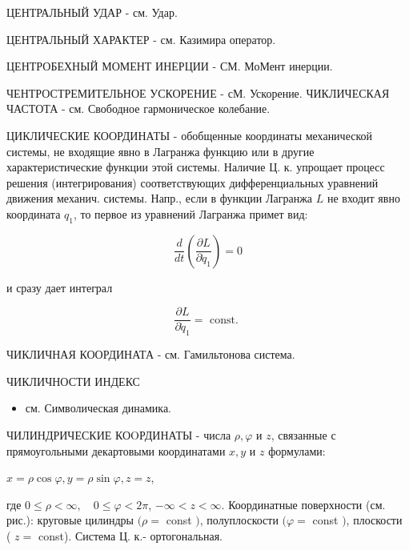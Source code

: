 \documentclass[10pt]{article}
\begin{document}
ЦЕНТРАЛЬНЫЙ УДАР - см. Удар.



ЦЕНТРАЛЬНЫЙ ХАРАКТЕР - см. Казимира оператор.



ЦЕНТРОБЕХНЫЙ МОМЕНТ ИНЕРЦИИ - СМ. МоМент инерции.



ЧЕНТРОСТРЕМИТЕЛЬНОЕ УСКОРЕНИЕ - сМ. Ускорение. ЧИКЛИЧЕСКАЯ ЧАСТОТА - см. Свободное гармоническое колебание.



ЦИКЛИЧЕСКИЕ КООРДИНАТЫ - обобщенные координаты механической системы, не входящие явно в Лагранжа функцию или в другие характеристические функции этой системы. Наличие Ц. к. упрощает процесс решения (интегрирования) соответствующих дифференциальных уравнений движения механич. системы. Напр., если в функции Лагранжа $L$ не входит явно координата $q_{1}$, то первое из уравнений Лагранжа примет вид:



\[

\frac{d}{d t}\left(\frac{\partial L}{\partial \dot{q}_{1}}\right)=0

\]



и сразу дает интеграл



\[

\frac{\partial L}{\partial \dot{q}_{1}}=\text { const. }

\]



ЧИКЛИЧНАЯ КООРДИНАТА - см. Гамильтонова система.



ЧИКЛИЧНОСТИ ИНДЕКС



\begin{itemize}

  \item см. Символическая динамика.

\end{itemize}



ЧИЛИНДРИЧЕСКИЕ КОOРДИНАТЫ - числа $\rho, \varphi$ и $z$, связанные с прямоугольными декартовыми координатами $x, y$ и $z$ формулами:



$x=\rho \cos \varphi, y=\rho \sin \varphi, z=z$,



где $0 \leqslant \rho<\infty, \quad 0 \leqslant \varphi<2 \pi$, $-\infty<z<\infty$. Координатные поверхности (см. рис.): круговые цилиндры $(\rho=$ const $)$, полуплоскости $(\varphi=$ const $)$, плоскости ( $z=$ const). Система Ц. к.- ортогональная.
\end{document}
